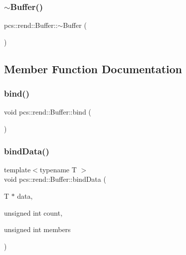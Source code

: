 \subsubsection{\texorpdfstring{$\sim$\+Buffer()}{~Buffer()}}
{\footnotesize\ttfamily pcs\+::rend\+::\+Buffer\+::$\sim$\+Buffer (\begin{DoxyParamCaption}{ }\end{DoxyParamCaption})}



\subsection{Member Function Documentation}
\mbox{\label{classpcs_1_1rend_1_1Buffer_a1be9c6c19cee147e580c8d1038a664a9}} 
\subsubsection{\texorpdfstring{bind()}{bind()}}
{\footnotesize\ttfamily void pcs\+::rend\+::\+Buffer\+::bind (\begin{DoxyParamCaption}{ }\end{DoxyParamCaption})}

\mbox{\label{classpcs_1_1rend_1_1Buffer_a3e8a8fa6bbd51354ef27e86151d64022}} 
\subsubsection{\texorpdfstring{bind\+Data()}{bindData()}\hspace{0.1cm}{\footnotesize\ttfamily [1/3]}}
{\footnotesize\ttfamily template$<$typename T $>$ \\
void pcs\+::rend\+::\+Buffer\+::bind\+Data (\begin{DoxyParamCaption}\item[{T $\ast$}]{data,  }\item[{unsigned int}]{count,  }\item[{unsigned int}]{members }\end{DoxyParamCaption})\hspace{0.3cm}{\ttfamily [inline]}}

